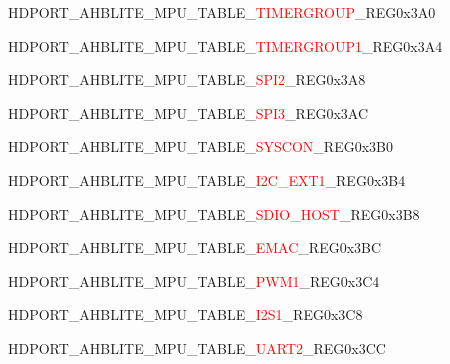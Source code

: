 \vspace{-3em}
\begin{register}{H}{DPORT\_AHBLITE\_MPU\_TABLE\_\textcolor{red}{TIMERGROUP}\_REG}{0x3A0}\label{regdesc:AHBLITEMPUTABLETIMERGROUPREG}
\end{register}
\vspace{-3em}
\begin{register}{H}{DPORT\_AHBLITE\_MPU\_TABLE\_\textcolor{red}{TIMERGROUP1}\_REG}{0x3A4}\label{regdesc:AHBLITEMPUTABLETIMERGROUP1REG}
\end{register}
\vspace{-3em}
\begin{register}{H}{DPORT\_AHBLITE\_MPU\_TABLE\_\textcolor{red}{SPI2}\_REG}{0x3A8}\label{regdesc:AHBLITEMPUTABLESPI2REG}
\end{register}
\vspace{-3em}
\begin{register}{H}{DPORT\_AHBLITE\_MPU\_TABLE\_\textcolor{red}{SPI3}\_REG}{0x3AC}\label{regdesc:AHBLITEMPUTABLESPI3REG}
\end{register}
\vspace{-3em}
\begin{register}{H}{DPORT\_AHBLITE\_MPU\_TABLE\_\textcolor{red}{SYSCON}\_REG}{0x3B0}\label{regdesc:AHBLITEMPUTABLEAPBCTRLREG}
\end{register}
\vspace{-3em}
\begin{register}{H}{DPORT\_AHBLITE\_MPU\_TABLE\_\textcolor{red}{I2C\_EXT1}\_REG}{0x3B4}\label{regdesc:AHBLITEMPUTABLEI2CEXT1REG}
\end{register}
\vspace{-3em}
\begin{register}{H}{DPORT\_AHBLITE\_MPU\_TABLE\_\textcolor{red}{SDIO\_HOST}\_REG}{0x3B8}\label{regdesc:AHBLITEMPUTABLESDIOHOSTREG}
\end{register}
\vspace{-3em}
\begin{register}{H}{DPORT\_AHBLITE\_MPU\_TABLE\_\textcolor{red}{EMAC}\_REG}{0x3BC}\label{regdesc:AHBLITEMPUTABLEEMACREG}
\end{register}
\vspace{-3em}
\begin{register}{H}{DPORT\_AHBLITE\_MPU\_TABLE\_\textcolor{red}{PWM1}\_REG}{0x3C4}\label{regdesc:AHBLITEMPUTABLEPWM1REG}
\end{register}
\vspace{-3em}
\begin{register}{H}{DPORT\_AHBLITE\_MPU\_TABLE\_\textcolor{red}{I2S1}\_REG}{0x3C8}\label{regdesc:AHBLITEMPUTABLEI2S1REG}
\end{register}
\vspace{-3em}
\begin{register}{H}{DPORT\_AHBLITE\_MPU\_TABLE\_\textcolor{red}{UART2}\_REG}{0x3CC}\label{regdesc:AHBLITEMPUTABLEUART2REG}
\end{register}
\vspace{-3em}

